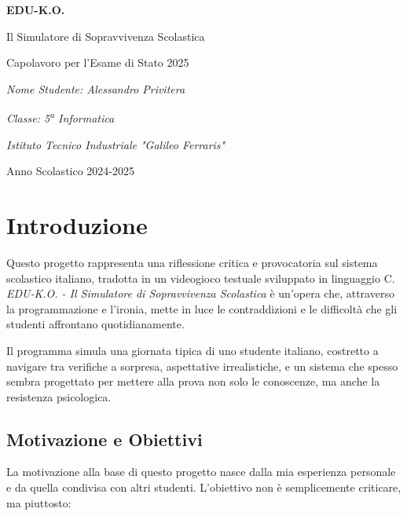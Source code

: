 \documentclass[a4paper,12pt]{article}
\begin{document}
\begin{titlepage}
    \centering
    \vspace*{1cm}
    {\Huge\textbf{EDU-K.O.\\}\par}
    \vspace{1cm}
    {\LARGE Il Simulatore di Sopravvivenza Scolastica\par}
    \vspace{2cm}
    {\large Capolavoro per l'Esame di Stato 2025\par}
    \vspace{3cm}
    {\large\itshape Nome Studente: Alessandro Privitera\par}
    {\large\itshape Classe: 5\textsuperscript{a} Informatica\par}
    \vspace{1cm}
    {\large\itshape Istituto Tecnico Industriale "Galileo Ferraris"\par}
    \vspace{1cm}
    {\large Anno Scolastico 2024-2025\par}
\end{titlepage}

\tableofcontents
\newpage

\section{Introduzione}

Questo progetto rappresenta una riflessione critica e provocatoria sul sistema scolastico italiano, tradotta in un videogioco testuale sviluppato in linguaggio C. \textit{EDU-K.O. - Il Simulatore di Sopravvivenza Scolastica} è un'opera che, attraverso la programmazione e l'ironia, mette in luce le contraddizioni e le difficoltà che gli studenti affrontano quotidianamente.

Il programma simula una giornata tipica di uno studente italiano, costretto a navigare tra verifiche a sorpresa, aspettative irrealistiche, e un sistema che spesso sembra progettato per mettere alla prova non solo le conoscenze, ma anche la resistenza psicologica.

\subsection{Motivazione e Obiettivi}

La motivazione alla base di questo progetto nasce dalla mia esperienza personale e da quella condivisa con altri studenti. L'obiettivo non è semplicemente criticare, ma piuttosto:
\end{document}

